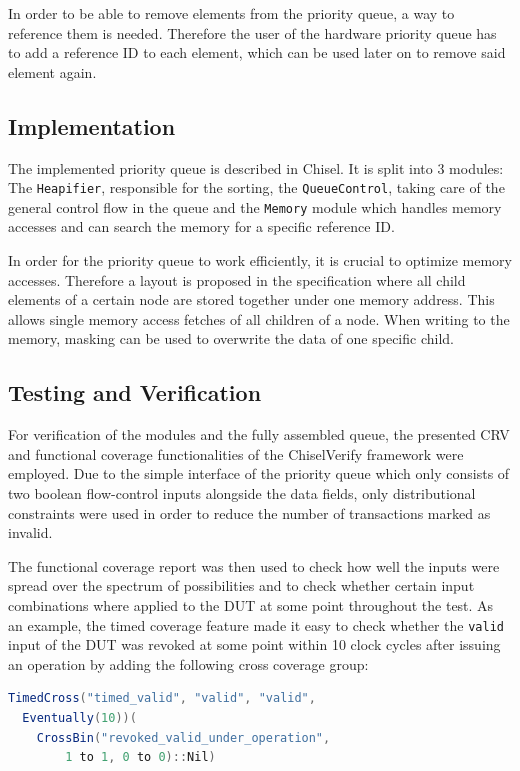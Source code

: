 \documentclass[conference]{IEEEtran}
\begin{document}
In order to be able to remove elements from the priority queue, a way to reference them is needed. Therefore the user of the hardware priority queue has to add a reference ID to each element, which can be used later on to remove said element again.

\subsection{Implementation}

The implemented priority queue is described in Chisel.
It is split into 3 modules: The \texttt{Heapifier}, responsible for the sorting, the \texttt{QueueControl}, taking care
of the general control flow in the queue and the \texttt{Memory} module which handles memory accesses and can search the memory for a specific reference 
ID.

In order for the priority queue to work efficiently, it is crucial to optimize memory accesses. Therefore a layout is proposed in the specification where all 
child elements of a certain node are stored together under one memory address. This allows single memory access fetches of all children of a node. When writing to the memory, masking can be used to overwrite the data of one specific child.


\subsection{Testing and Verification}

For verification of the modules and the fully assembled queue, the presented CRV and functional coverage functionalities of the ChiselVerify framework were employed. Due to the simple interface of the priority queue which only consists of two boolean flow-control inputs alongside the data fields, only distributional constraints were used in order to reduce the number of transactions marked as invalid. 

The functional coverage report was then used to check how well the inputs were spread over the spectrum of possibilities and to check whether certain input combinations where applied to the DUT at some point throughout the test. As an example, the timed coverage feature made it easy to check whether the \texttt{valid} input of the DUT was revoked at some point within 10 clock cycles after issuing an operation by adding the following cross coverage group:

\begin{lstlisting}[language=scala, caption={Using the AXI4 BFM with ChiselTest}, label={lst:axitest}]
TimedCross("timed_valid", "valid", "valid",
  Eventually(10))(
    CrossBin("revoked_valid_under_operation",
        1 to 1, 0 to 0)::Nil)
\end{lstlisting}
\end{document}

